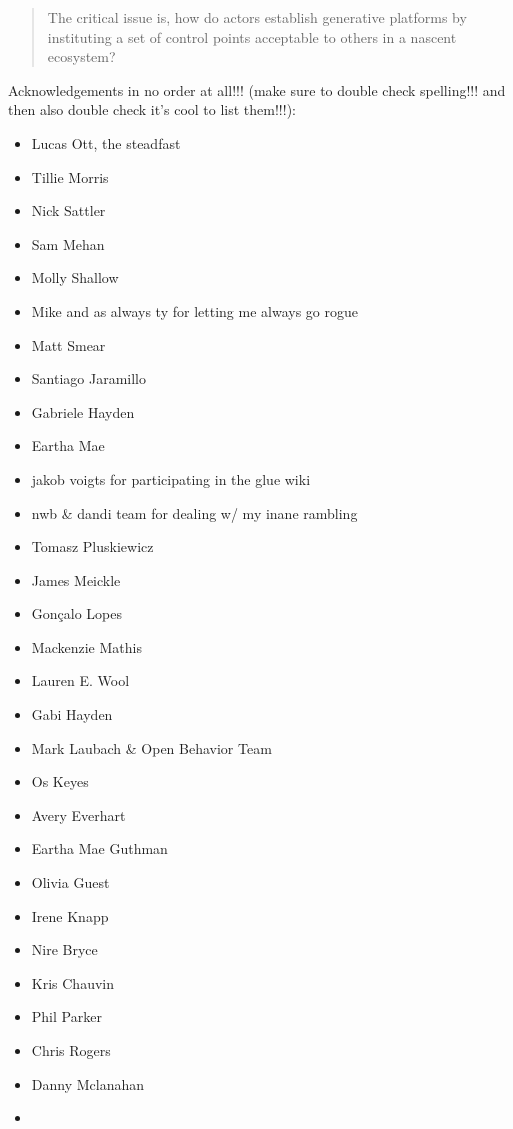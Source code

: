 \documentclass[notoc]{tufte-book}
\begin{document}
\begin{quote}
The critical issue is, how do actors establish generative platforms by
instituting a set of control points acceptable to others in a nascent
ecosystem? 
\end{quote}
\citep{tilsonDigitalInfrastructuresMissing2010} 

Acknowledgements in no order at all!!! (make sure to double check
spelling!!! and then also double check it's cool to list them!!!):

\begin{itemize}

\item
  Lucas Ott, the steadfast
\item
  Tillie Morris
\item
  Nick Sattler
\item
  Sam Mehan
\item
  Molly Shallow
\item
  Mike and as always ty for letting me always go rogue
\item
  Matt Smear
\item
  Santiago Jaramillo
\item
  Gabriele Hayden
\item
  Eartha Mae
\item
  jakob voigts for participating in the glue wiki
\item
  nwb \& dandi team for dealing w/ my inane rambling
\item
  Tomasz Pluskiewicz
\item
  James Meickle
\item
  Gonçalo Lopes
\item
  Mackenzie Mathis
\item
  Lauren E. Wool
\item
  Gabi Hayden
\item
  Mark Laubach \& Open Behavior Team
\item
  Os Keyes
\item
  Avery Everhart
\item
  Eartha Mae Guthman
\item
  Olivia Guest
\item
  Irene Knapp
\item
  Nire Bryce
\item
  Kris Chauvin
\item
  Phil Parker
\item
  Chris Rogers
\item
  Danny Mclanahan
\item

\end{itemize}
\end{document}
